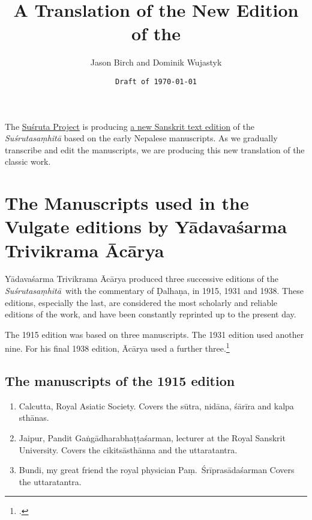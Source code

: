\documentclass[12pt]{article}
\title{A Translation of the New Edition of the \SS}
\author{Jason Birch and Dominik Wujastyk}
\date{\texttt{Draft of \today }}
\renewcommand{\SS}{\emph{Suśrutasaṃhitā}}
\begin{document}
       
    
    \maketitle
    
    
        \noindent The \href{http://sushrutaproject.org}{Suśruta Project} is
producing
\href{https://saktumiva.org/wiki/wujastyk/susrutasamhita/01-su.su/provisional-edition_sutrasthana}{a
 new Sanskrit text edition} of the \emph{Suśrutasaṃhitā} based on the early 
Nepalese manuscripts.  As we gradually transcribe and edit the manuscripts, we are 
producing this new translation of the classic work.
        
        \tableofcontents
        
        \newpage
        \section{The Manuscripts used in the Vulgate editions by 
        Yādavaśarma Trivikrama Ācārya}
    
        Yādavaśarma Trivikrama Ācārya produced three successive editions of the \SS\ 
        with the commentary of Ḍalhaṇa, in 1915, 1931 and 1938.  These editions, 
        especially the last, are considered the most scholarly and reliable editions of the 
        work, and have been constantly reprinted up to the present day.
        
        The 1915 edition was based on three manuscripts.  The 1931 edition used 
        another nine.  For his final 1938 edition, Ācārya used a further 
        three.\footnote{\cite[22]{susr-trikamji3}.}
        
        \subsection{The manuscripts of the 1915 edition}
        
        \begin{enumerate}
            \item[1] Calcutta, Royal Asiatic Society.  Covers the sūtra, nidāna, śārīra and 
            kalpa sthānas.  
            
            \item [2] Jaipur, Pandit Gaṅgādharabhaṭṭaśarman, lecturer at the Royal 
            Sanskrit University.  Covers the cikitsāsthānna and the uttaratantra.
            
            \item [3]  Bundi, my great friend the royal physician Paṃ.\ Śrīprasādaśarman  
            Covers the uttaratantra.
        \end{enumerate}
        
\end{document}
